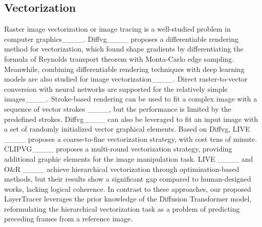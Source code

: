 



\subsection{Vectorization}
Raster image vectorization or image tracing is a well-studied problem in computer graphics____. Diffvg____ proposes a differentiable rendering method for vectorization, which found shape gradients by differentiating the formula of Reynolds transport theorem with Monta-Carlo edge sampling. Meanwhile, combining differentiable rendering techniques with deep learning models are also studied for image vectorization____. Direct raster-to-vector conversion with neural networks are supported for the relatively simple images____.  Stroke-based rendering can be used to fit a complex image with a sequence of vector strokes ____, but the performance is limited by the predefined strokes. Diffvg____ can also be leveraged to fit an input image with a set of randomly initialized vector graphical elements. Based on Diffvg, LIVE ____ proposes a coarse-to-fine vectorization strategy, with cost tens of minute. CLIPVG____ proposes a multi-round vectorization strategy,  providing additional graphic elements for the image manipulation task. LIVE ____ and O\&R ____ achieve hierarchical vectorization through optimization-based methods, but their results show a significant gap compared to human-designed works, lacking logical coherence. In contrast to these approaches, our proposed LayerTracer leverages the prior knowledge of the Diffusion Transformer model, reformulating the hierarchical vectorization task as a problem of predicting preceding frames from a reference image.

